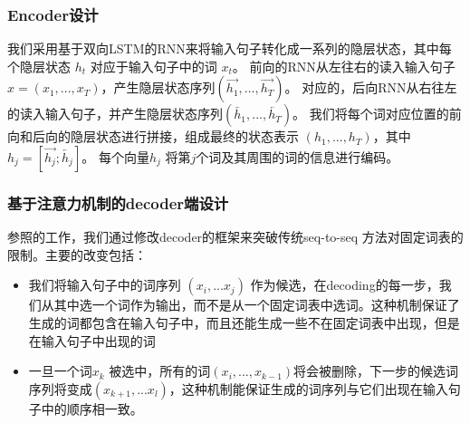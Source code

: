 




\subsubsection*{Encoder设计}
我们采用基于双向LSTM的RNN来将输入句子转化成一系列的隐层状态，其中每个隐层状态
$h_t$ 对应于输入句子中的词 $x_t$。
前向的RNN从左往右的读入输入句子$x = (x_1, . . . , x_T )$，产生隐层状态序列$(\overrightarrow{h_{1}}, . . . , \overrightarrow{h_{T}} )$。
对应的，后向RNN从右往左的读入输入句子，并产生隐层状态序列$(\overleftarrow{h_{1}}, . . . , \overleftarrow{h_{T}} )$。
我们将每个词对应位置的前向和后向的隐层状态进行拼接，组成最终的状态表示 $(h_{1}, . . . , h_{T} )$，其中$h_j = [\overrightarrow{h_{j}} ; \overleftarrow{h_{j}}]$。
每个向量$h_j$ 将第$j$个词及其周围的词的信息进行编码。

\subsubsection*{基于注意力机制的decoder端设计}


参照的工作，我们通过修改decoder的框架来突破传统seq-to-seq 方法对固定词表的限制。主要的改变包括：

\begin{itemize}
	\item 我们将输入句子中的词序列 $(x_i, ... x_j)$ 作为候选，在decoding的每一步，我们从其中选一个词作为输出，而不是从一个固定词表中选词。这种机制保证了生成的词都包含在输入句子中，而且还能生成一些不在固定词表中出现，但是在输入句子中出现的词
	\item 一旦一个词$x_k$ 被选中，所有的词$(x_i, ... , x_{k-1})$将会被删除，下一步的候选词序列将变成$(x_{k+1}, ... x_l)$，这种机制能保证生成的词序列与它们出现在输入句子中的顺序相一致。
\end{itemize}

